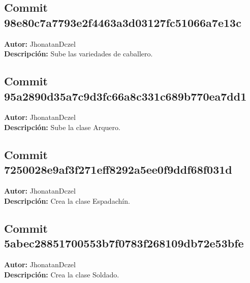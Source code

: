\subsection*{Commit 98e80c7a7793e2f4463a3d03127fc51066a7e13c}
\textbf{Autor:} JhonatanDczel \\
\textbf{Descripción:} Sube las variedades de caballero.

\subsection*{Commit 95a2890d35a7c9d3fc66a8c331c689b770ea7dd1}
\textbf{Autor:} JhonatanDczel \\
\textbf{Descripción:} Sube la clase Arquero.

\subsection*{Commit 7250028e9af3f271eff8292a5ee0f9ddf68f031d}
\textbf{Autor:} JhonatanDczel \\
\textbf{Descripción:} Crea la clase Espadachín.

\subsection*{Commit 5abec28851700553b7f0783f268109db72e53bfe}
\textbf{Autor:} JhonatanDczel \\
\textbf{Descripción:} Crea la clase Soldado.

